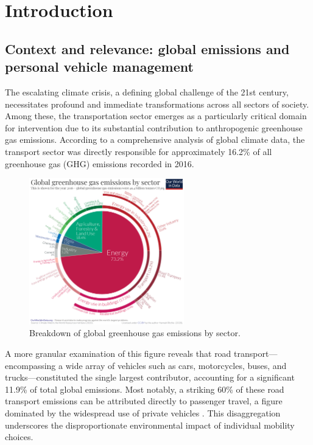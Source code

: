 \chapter{Introduction}

\section{Context and relevance: global emissions and personal vehicle management}

The escalating climate crisis, a defining global challenge of the 21st century, necessitates profound and immediate transformations across all sectors of society. Among these, the transportation sector emerges as a particularly critical domain for intervention due to its substantial contribution to anthropogenic greenhouse gas emissions. According to a comprehensive analysis of global climate data, the transport sector was directly responsible for approximately 16.2\% of all greenhouse gas (GHG) emissions recorded in 2016. 

\textgap

\begin{figure}[H]
\centering
\includegraphics[width=0.6\textwidth]{images/ghg-emissions-by-sector.png}
\caption{Breakdown of global greenhouse gas emissions by sector.}
\end{figure}

A more granular examination of this figure reveals that road transport—encompassing a wide array of vehicles such as cars, motorcycles, buses, and trucks—constituted the single largest contributor, accounting for a significant 11.9\% of total global emissions. Most notably, a striking 60\% of these road transport emissions can be attributed directly to passenger travel, a figure dominated by the widespread use of private vehicles \cite{owid-ghg-emissions-by-sector}. This disaggregation underscores the disproportionate environmental impact of individual mobility choices.

